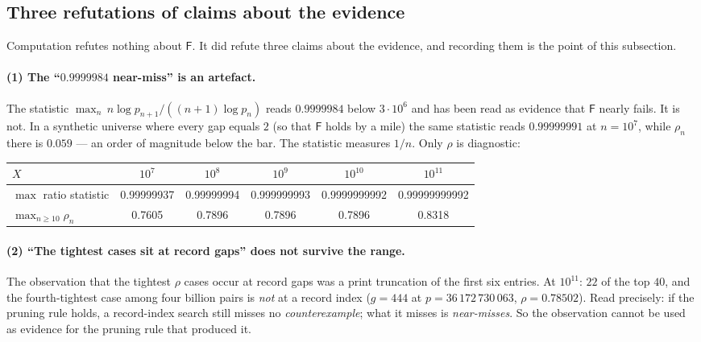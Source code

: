 \documentclass[11pt,a4paper]{article}
\theoremstyle{plain}
\theoremstyle{definition}
\theoremstyle{remark}
\newcommand{\Fb}{\mathsf{F}}
\begin{document}
\subsection{Three refutations of claims about the evidence}
\label{sec:artefact}

Computation refutes nothing about $\Fb$. It did refute three claims about the evidence, and
recording them is the point of this subsection.

\paragraph{(1) The ``$0.9999984$ near-miss'' is an artefact.}
The statistic $\max_n\, n\log p_{n+1}/((n+1)\log p_n)$ reads $0.9999984$ below $3\cdot10^6$
and has been read as evidence that $\Fb$ nearly fails. It is not. In a synthetic universe
where every gap equals $2$ (so that $\Fb$ holds by a mile) the same statistic reads
$0.99999991$ at $n = 10^7$, while $\rho_n$ there is $0.059$ --- an order of magnitude below
the bar. The statistic measures $1/n$. Only $\rho$ is diagnostic:

\begin{center}
\begin{tabular}{@{}lccccc@{}}
\toprule
$X$ & $10^7$ & $10^8$ & $10^9$ & $10^{10}$ & $10^{11}$ \\
\midrule
$\max$ ratio statistic & 0.99999937 & 0.99999994 & 0.999999993 & 0.9999999992 & 0.99999999992 \\
$\max_{n\ge10}\rho_n$ & 0.7605 & 0.7896 & 0.7896 & 0.7896 & 0.8318 \\
\bottomrule
\end{tabular}
\end{center}

\paragraph{(2) ``The tightest cases sit at record gaps'' does not survive the range.}
The observation that the tightest $\rho$ cases occur at record gaps was a print truncation of
the first six entries. At $10^{11}$: $22$ of the top $40$, and the fourth-tightest case among
four billion pairs is \emph{not} at a record index ($g = 444$ at $p = 36\,172\,730\,063$,
$\rho = 0.78502$). Read precisely: if the pruning rule holds, a record-index search still
misses no \emph{counterexample}; what it misses is \emph{near-misses}. So the observation
cannot be used as evidence for the pruning rule that produced it.
\end{document}
